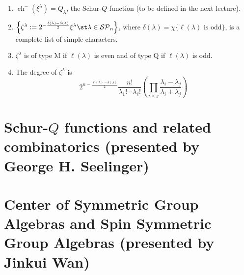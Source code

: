 \documentclass[11pt,leqno,oneside]{amsbook}
\newcommand{\SP}{\mathcal{SP}} %
\DeclareMathOperator{\ch}{ch}
\numberwithin{thm}{section}
\begin{document}
\begin{thm}
  \begin{enumerate}
  \item \(\ch^-(\xi^\lambda) = Q_\lambda\), the Schur-\(Q\) function
    (to be defined in the next lecture).
  \item \(\left\{ \zeta^\lambda :=
      2^{-\frac{\ell(\lambda)-\delta(\lambda)}{2}} \xi^\lambda \st
      \lambda \in \SP_n \right\}\), where \(\delta(\lambda) =
    \chi\{\ell(\lambda) \text{ is odd}\}\), is a complete list of
    simple characters.
  \item \(\zeta^\lambda\) is of type M if \(\ell(\lambda)\) is even
    and of type Q if \(\ell(\lambda)\) is odd.
  \item The degree of \(\zeta^\lambda\) is \[
      2^{n-\frac{\ell(\lambda)-\delta(\lambda)}{2}}
      \frac{n!}{\lambda_1! \cdots \lambda_\ell!}\left( \prod_{i<j}
      \frac{\lambda_i-\lambda_j}{\lambda_i+\lambda_j}\right) 
    \]
  \end{enumerate}
\end{thm}
\section{Schur-\(Q\) functions and related combinatorics (presented by
  George H. Seelinger)}
\section{Center of Symmetric Group Algebras and Spin Symmetric Group
  Algebras (presented by Jinkui Wan)}
\end{document}
